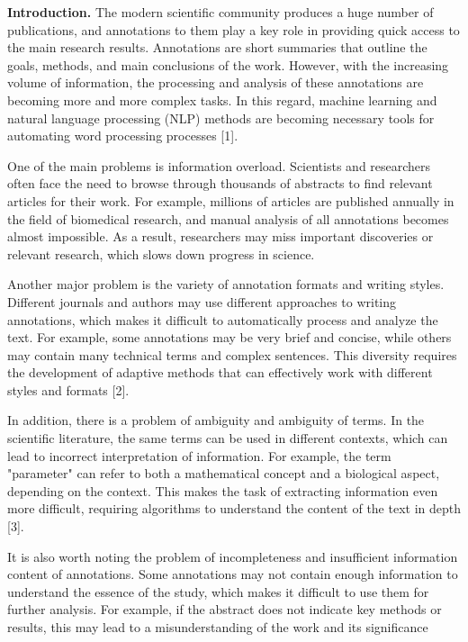 {\bfseries Introduction.} The modern scientific community produces a huge
number of publications, and annotations to them play a key role in
providing quick access to the main research results. Annotations are
short summaries that outline the goals, methods, and main conclusions of
the work. However, with the increasing volume of information, the
processing and analysis of these annotations are becoming more and more
complex tasks. In this regard, machine learning and natural language
processing (NLP) methods are becoming necessary tools for automating
word processing processes {[}1{]}.

One of the main problems is information overload. Scientists and
researchers often face the need to browse through thousands of abstracts
to find relevant articles for their work. For example, millions of
articles are published annually in the field of biomedical research, and
manual analysis of all annotations becomes almost impossible. As a
result, researchers may miss important discoveries or relevant research,
which slows down progress in science.

Another major problem is the variety of annotation formats and writing
styles. Different journals and authors may use different approaches to
writing annotations, which makes it difficult to automatically process
and analyze the text. For example, some annotations may be very brief
and concise, while others may contain many technical terms and complex
sentences. This diversity requires the development of adaptive methods
that can effectively work with different styles and formats {[}2{]}.

In addition, there is a problem of ambiguity and ambiguity of terms. In
the scientific literature, the same terms can be used in different
contexts, which can lead to incorrect interpretation of information. For
example, the term "parameter" can refer to both a mathematical concept
and a biological aspect, depending on the context. This makes the task
of extracting information even more difficult, requiring algorithms to
understand the content of the text in depth {[}3{]}.

It is also worth noting the problem of incompleteness and insufficient
information content of annotations. Some annotations may not contain
enough information to understand the essence of the study, which makes
it difficult to use them for further analysis. For example, if the
abstract does not indicate key methods or results, this may lead to a
misunderstanding of the work and its significance

